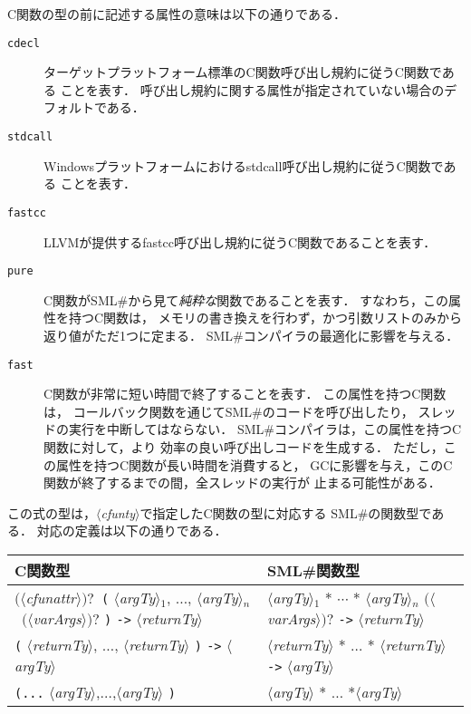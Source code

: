 \documentclass{jbook}
\newcommand{\smlsharp}{SML\#}
\newcommand{\nonterm}[1]{\mbox{$\langle$}{\it #1}\mbox{$\rangle$}}
\newcommand{\term}[1]{\mbox{{\tt #1}}}
\newcommand{\optional}[1]{\mbox{$($}{\protect #1}\mbox{$)?$}}
\begin{document}
	C関数の型の前に記述する属性の意味は以下の通りである．
\begin{description}
\item[{\tt cdecl}]
	ターゲットプラットフォーム標準のC関数呼び出し規約に従うC関数である
ことを表す．
	呼び出し規約に関する属性が指定されていない場合のデフォルトである．
\item[{\tt stdcall}]
	Windowsプラットフォームにおけるstdcall呼び出し規約に従うC関数である
ことを表す．
\item[{\tt fastcc}]
	LLVMが提供するfastcc呼び出し規約に従うC関数であることを表す．
\item[{\tt pure}]
	C関数が\smlsharp{}から見て{\em 純粋な}関数であることを表す．
	すなわち，この属性を持つC関数は，
メモリの書き換えを行わず，かつ引数リストのみから返り値がただ1つに定まる．
	\smlsharp{}コンパイラの最適化に影響を与える．
\item[{\tt fast}]
	C関数が非常に短い時間で終了することを表す．
	この属性を持つC関数は，
コールバック関数を通じて\smlsharp{}のコードを呼び出したり，
スレッドの実行を中断してはならない．
	\smlsharp{}コンパイラは，この属性を持つC関数に対して，より
効率の良い呼び出しコードを生成する．
	ただし，この属性を持つC関数が長い時間を消費すると，
GCに影響を与え，このC関数が終了するまでの間，全スレッドの実行が
止まる可能性がある．
\end{description}

	この式の型は，\nonterm{cfunty}で指定したC関数の型に対応する
\smlsharp{}の関数型である．
	対応の定義は以下の通りである．

\begin{center}
\begin{tabular}{|l|l|}
\hline
C関数型 & \smlsharp{}関数型
\\\hline
\optional{\nonterm{cfunattr}}\ 
\term{(} \nonterm{argTy}$_1$, $\ldots$, \nonterm{argTy}$_n$\
       \optional{\nonterm{varArgs}} \term{)}
 \term{->} \nonterm{returnTy}
&
\nonterm{argTy}$_1$ * $\cdots$ * \nonterm{argTy}$_n$  \optional{* \nonterm{varArgs}} \term{->}
    \nonterm{returnTy}
\\\hline
\term{(} \nonterm{returnTy}, $\ldots$, \nonterm{returnTy} \term{)} \term{->}
\nonterm{argTy}
&
\nonterm{returnTy} * $\ldots$ * \nonterm{returnTy} \term{->} \nonterm{argTy}
\\\hline
\term{(...} \nonterm{argTy},$\ldots$,\nonterm{argTy} \term{)} &
\nonterm{argTy} * $\ldots$ *\nonterm{argTy}
\\\hline
\end{tabular}
\end{center}
\end{document}
